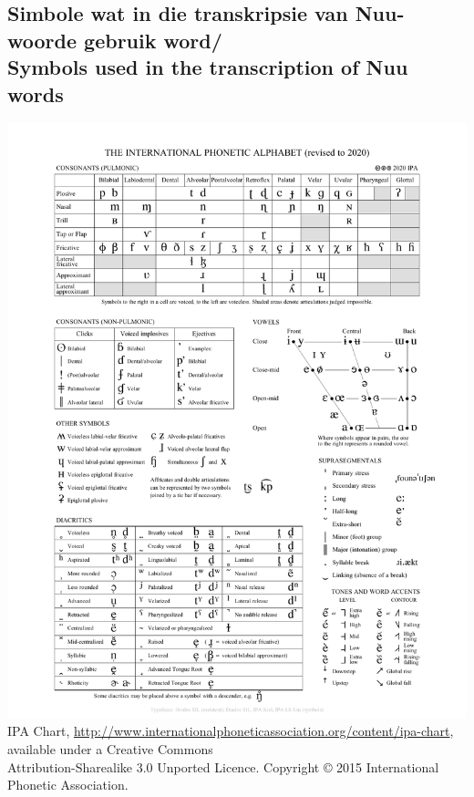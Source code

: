 \pagebreak


\markboth{}{}
\subsection{Simbole wat in die transkripsie van
N\textipa{\textvertline}uu-woorde gebruik word/\\Symbols used in the
transcription of N\textipa{\textvertline}uu words}
\label{s:symbols}
\markboth{}{}

\includegraphics[width=.95\textwidth,trim=1.5cm .4cm 1cm
1cm]{IPA_Kiel_2020_full.pdf}\\
{\small IPA Chart,
\url{http://www.internationalphoneticassociation.org/content/ipa-chart},
available under a Creative Commons\\Attribution-Sharealike 3.0 Unported
Licence. Copyright \copyright{} 2015 International Phonetic
Association.}



